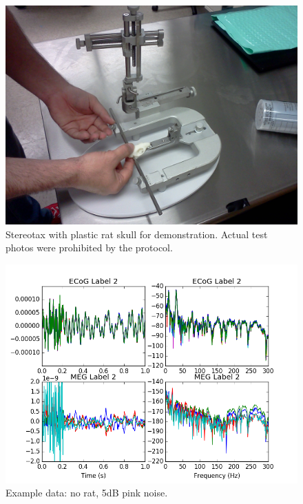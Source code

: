 \documentclass[journal,12pt,onecolumn,draftclsnofoot]{IEEEtran}
\begin{document}
\begin{figure}[h!]
\centering
\includegraphics[width=5in]{finalplots/stereotax1}
\caption{Stereotax with plastic rat skull for demonstration. Actual test photos were prohibited by the protocol.}
\label{fig:stereotax}
\end{figure}

\begin{figure}[h!]
\centering
\includegraphics[width=5in]{finalplots/norat5dbpink}
\caption{Example data: no rat, 5dB pink noise.}
\label{fig:norat5dbpink}
\end{figure}
\end{document}
